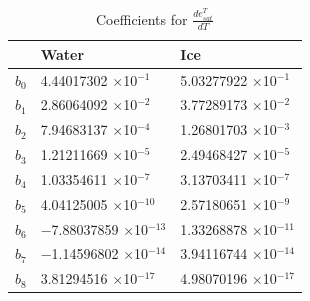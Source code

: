 \documentclass[12pt,authoryear]{elsarticle}
\numberwithin{equation}{section} %
\begin{document}
\begin{table}[H]
\centering
\caption{Coefficients for $\frac{d e_{sat}^{T}}{dT}$}
\label{tab:coefficient_saturation_vapor_pressure_partial}
\begin{tabular}{p{1cm}p{4.5cm}p{4.5cm}}
\hline
& Water & Ice \\
\hline
$b_{0}$ & 4.44017302 $\times$10$^{-1}$ & 5.03277922 $\times$10$^{-1}$ \\
$b_{1}$ & 2.86064092 $\times$10$^{-2}$ & 3.77289173 $\times$10$^{-2}$ \\
$b_{2}$ & 7.94683137 $\times$10$^{-4}$ & 1.26801703 $\times$10$^{-3}$ \\
$b_{3}$ & 1.21211669 $\times$10$^{-5}$ & 2.49468427 $\times$10$^{-5}$ \\
$b_{4}$ & 1.03354611 $\times$10$^{-7}$ & 3.13703411 $\times$10$^{-7}$ \\
$b_{5}$ & 4.04125005 $\times$10$^{-10}$ & 2.57180651 $\times$10$^{-9}$ \\
$b_{6}$ & $-$7.88037859 $\times$10$^{-13}$ & 1.33268878 $\times$10$^{-11}$ \\
$b_{7}$ & $-$1.14596802 $\times$10$^{-14}$ & 3.94116744 $\times$10$^{-14}$ \\
$b_{8}$ & 3.81294516 $\times$10$^{-17}$ & 4.98070196 $\times$10$^{-17}$ \\
\hline
\end{tabular}
\end{table}

\end{document}
